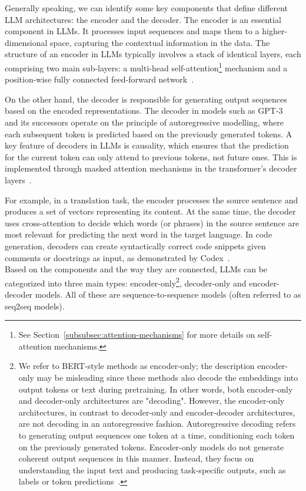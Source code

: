 Generally speaking, we can identify some key components that define different LLM architectures: the encoder and the decoder.
The encoder is an essential component in LLMs. It processes input sequences and maps them to a higher-dimensional space, capturing the contextual information in the data.
The structure of an encoder in LLMs typically involves a stack of identical layers, each comprising two main sub-layers: a multi-head self-attention\footnote{See Section~\ref{subsubsec:attention-mechanisms} for more details on self-attention mechanisms.} mechanism and a position-wise fully connected feed-forward network~\cite{vaswani2023attention}.

On the other hand, the decoder is responsible for generating output sequences based on the encoded representations.
The decoder in models such as GPT-3~\cite{brown2020language} and its successors operate on the principle of autoregressive modelling, where each subsequent token is predicted based on the previously generated tokens.
A key feature of decoders in LLMs is causality, which ensures that the prediction for the current token can only attend to previous tokens, not future ones.
This is implemented through masked attention mechanisms in the transformer's decoder layers~\cite{vaswani2023attention}.

For example, in a translation task, the encoder processes the source sentence and produces a set of vectors representing its content.
At the same time, the decoder uses cross-attention to decide which words (or phrases) in the source sentence are most relevant for predicting the next word in the target language.
In code generation, decoders can create syntactically correct code snippets given comments or docstrings as input, as demonstrated by Codex~\cite{chen2021evaluating}.\\

Based on the components and the way they are connected, LLMs can be categorized into three main types: encoder-only\footnote{
	We refer to BERT-style methods as encoder-only; the description encoder-only may be misleading since these methods also decode the embeddings into output tokens or text during pretraining.
	In other words, both encoder-only and decoder-only architectures are "decoding". However, the encoder-only architectures, in contrast to decoder-only and encoder-decoder architectures, are not decoding in an autoregressive fashion.
	Autoregressive decoding refers to generating output sequences one token at a time, conditioning each token on the previously generated tokens.
	Encoder-only models do not generate coherent output sequences in this manner.
	Instead, they focus on understanding the input text and producing task-specific outputs, such as labels or token predictions~\cite{raschka2023encoderdecoder}.
},
decoder-only and encoder-decoder models.
All of these are sequence-to-sequence models (often referred to as seq2seq models).

